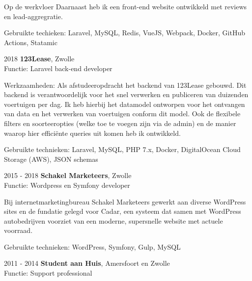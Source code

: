 \documentclass[12pt, a4paper]{article}
\begin{document}
\begin{cv}{}
\begin{cvlist}{Op de werkvloer}
                                Daarnaast heb ik een front-end website ontwikkeld met reviews en lead-aggregratie.

                                Gebruikte techieken: Laravel, MySQL, Redis, VueJS, Webpack, Docker, GitHub Actions, Statamic

            \item[2018]         \textbf{123Lease}, Zwolle \\
                                Functie: Laravel back-end developer
                                \par

                                Werkzaamheden:
                                Als afstudeeropdracht het backend van 123Lease gebouwd. Dit backend is verantwoordelijk
                                voor het snel verwerken en publiceren van duizenden voertuigen per dag. Ik heb hierbij
                                het datamodel ontworpen voor het ontvangen van data en het verwerken van voertuigen conform
                                dit model. Ook de flexibele filters en soorteeropties (welke toe te voegen zijn via de admin) en de manier waarop hier
                                efficiënte queries uit komen heb ik ontwikkeld.

                                Gebruikte technieken: Laravel, MySQL, PHP 7.x, Docker, DigitalOcean Cloud Storage (AWS), JSON schemas

            \item[2015 - 2018]  \textbf{Schakel Marketeers}, Zwolle \\
                                Functie: Wordpress en Symfony developer
                                \par

                                Bij internetmarketingbureau Schakel Marketeers gewerkt aan diverse
                                WordPress sites en de fundatie gelegd voor Cadar, een systeem dat samen
                                met WordPress autobedrijven voorziet van een moderne, supersnelle website
                                met actuele voorraad.

                                Gebruikte technieken: WordPress, Symfony, Gulp, MySQL

            \item[2011 - 2014]  \textbf{Student aan Huis}, Amersfoort en Zwolle \\
                                Functie: Support professional


\end{cvlist}
\end{cv}
\end{document}
